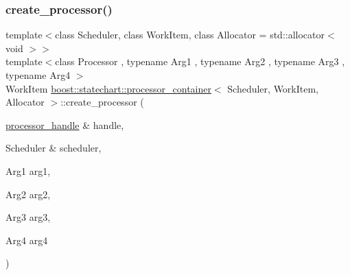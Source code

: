 \subsubsection{\texorpdfstring{create\+\_\+processor()}{create\_processor()}\hspace{0.1cm}{\footnotesize\ttfamily [5/7]}}
{\footnotesize\ttfamily template$<$class Scheduler, class Work\+Item, class Allocator = std\+::allocator$<$ void $>$$>$ \\
template$<$class Processor , typename Arg1 , typename Arg2 , typename Arg3 , typename Arg4 $>$ \\
Work\+Item \mbox{\hyperlink{classboost_1_1statechart_1_1processor__container}{boost\+::statechart\+::processor\+\_\+container}}$<$ Scheduler, Work\+Item, Allocator $>$\+::create\+\_\+processor (\begin{DoxyParamCaption}\item[{\mbox{\hyperlink{classboost_1_1statechart_1_1processor__container_a82ebbffaed81d7b99119ae0e892f6411}{processor\+\_\+handle}} \&}]{handle,  }\item[{Scheduler \&}]{scheduler,  }\item[{Arg1}]{arg1,  }\item[{Arg2}]{arg2,  }\item[{Arg3}]{arg3,  }\item[{Arg4}]{arg4 }\end{DoxyParamCaption})\hspace{0.3cm}{\ttfamily [inline]}}

\mbox{\label{classboost_1_1statechart_1_1processor__container_a0a00d34bbc4ec1fecab618ad9150ddea}} 
